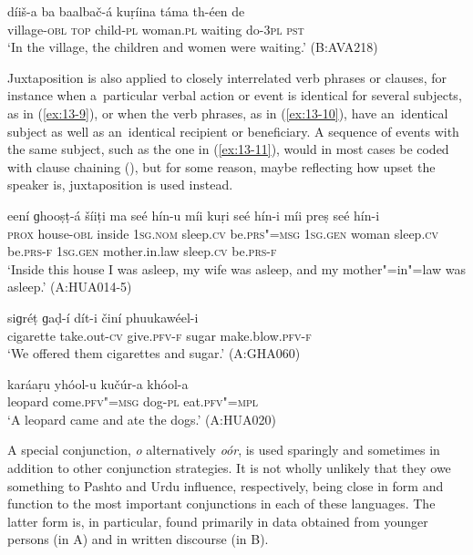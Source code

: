 \ex
\label{ex:13-8}
\gll díiš-a ba {\ob}baalbač-á kuṛíina{\cb} táma th-éen de \\
village-\textsc{obl} \textsc{top} child-\textsc{pl} woman.\textsc{pl} waiting do-\textsc{3pl} \textsc{pst}  \\
\glt `In the village, the children and women were waiting.' (B:AVA218) 
\z

Juxtaposition is also applied to closely interrelated verb phrases or clauses, for instance when a~particular verbal action or event is identical for several subjects, as in (\ref{ex:13-9}), or when the verb phrases, as in (\ref{ex:13-10}), have an~identical subject as well as an~identical recipient or beneficiary. A sequence of events with the same subject, such as the one in (\ref{ex:13-11}), would in most cases be coded with clause chaining (), but for some reason, maybe reflecting how upset the speaker is, juxtaposition is used instead.

\ea
\label{ex:13-9}
\gll eení ɡhooṣṭ-á šíiṭi {\ob}ma seé hín-u míi kuṛi seé hín-i míi preṣ seé hín-i{\cb}\\
\textsc{prox} house-\textsc{obl} inside \textsc{1sg.nom} sleep.\textsc{cv} be.\textsc{prs"=msg}  \textsc{1sg.gen} woman sleep.\textsc{cv} be.\textsc{prs-f } \textsc{1sg.gen} mother.in.law sleep.\textsc{cv} be.\textsc{prs-f} \\
\glt `Inside this house I was asleep, my wife was asleep, and my mother"=in"=law was asleep.' (A:HUA014-5)

\ex
\label{ex:13-10}
\gll siɡréṭ ɡaḍ-í dít-i činí phuukawéel-i\\
cigarette take.out-\textsc{cv} give.\textsc{pfv-f} sugar make.blow.\textsc{pfv-f} \\
\glt `We offered them cigarettes and sugar.' (A:GHA060)

\ex
\label{ex:13-11}
\gll karáaṛu yhóol-u kučúr-a khóol-a  \\
leopard come.\textsc{pfv"=msg} dog-\textsc{pl} eat.\textsc{pfv"=mpl} \\
\glt `A leopard came and ate the dogs.' (A:HUA020) 
\z

 A special conjunction, \textit{o} alternatively \textit{oór}, is used sparingly and sometimes in addition to other conjunction strategies. It is not wholly unlikely that they owe something to Pashto and Urdu influence, respectively, being close in form and function to the most important conjunctions in each of these languages. The latter form is, in particular, found primarily in data obtained from younger persons (in A) and in written discourse (in B). 



